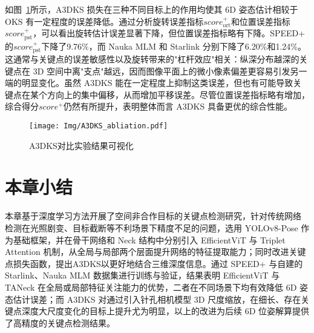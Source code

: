 \begin{table}[htbp] 
	\centering
	\caption{损失函数消融实验}
	\label{tab:OKSvsA3DKS}
	{%
	}
\end{table}

如图~\ref{fig:A3DKS}所示，A3DKS 损失在三种不同目标上的作用均使其 6D 姿态估计相较于 OKS 有一定程度的误差降低。通过分析旋转误差指标$score_{\text{ort}}^+$和位置误差指标$score_{\text{pst}}^+$，可以看出旋转估计误差显著下降，但位置误差指标略有下降。SPEED+ 的$score_{\text{pst}}^+$下降了9.76\%，而 Nauka MLM 和 Starlink 分别下降了6.20\%和1.24\%。这通常与关键点的误差敏感性以及旋转带来的"杠杆效应"相关：纵深分布越深的关键点在 3D 空间中离"支点"越远，因而图像平面上的微小像素偏差更容易引发另一端的明显变化。虽然 A3DKS 能在一定程度上抑制这类误差，但也有可能导致关键点在某个方向上的集中偏移，从而增加平移误差。尽管位置误差指标略有增加，综合得分$score^+$仍然有所提升，表明整体而言 A3DKS 具备更优的综合性能。
\begin{figure}[htbp]
	\centering
	\texttt{[image: Img/A3DKS\_abliation.pdf]}
	\caption{A3DKS对比实验结果可视化}
	\label{fig:A3DKS}
	\vspace{-20pt}
\end{figure}


\section{本章小结}
本章基于深度学习方法开展了空间非合作目标的关键点检测研究，针对传统网络 检测在光照剧变、目标截断等不利场景下精度不足的问题，选用 YOLOv8-Pose 作为基础框架，并在骨干网络和 Neck 结构中分别引入 EfficientViT 与 Triplet Attention 机制，从全局与局部两个层面提升网络的特征提取能力；同时改进关键点损失函数，提出A3DKS以更好地结合三维深度信息。通过 SPEED+ 与自建的 Starlink、Nauka MLM 数据集进行训练与验证，结果表明 EfficientViT 与 TANeck 在全局或局部特征关注能力的优势，二者在不同场景下均有效降低 6D 姿态估计误差；而 A3DKS 对通过引入针孔相机模型 3D 尺度缩放，在细长、存在关键点深度大尺度变化的目标上提升尤为明显，以上的改进为后续 6D 位姿解算提供了高精度的关键点检测结果。
